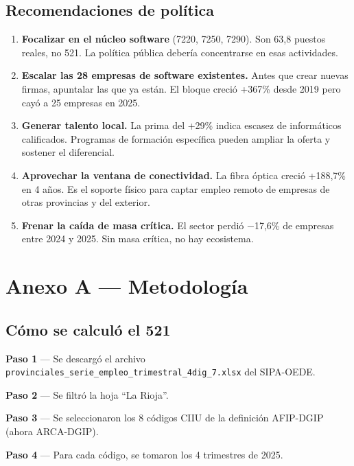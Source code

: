 \documentclass[
  spanish,
  letterpaper,
  DIV=11,
  numbers=noendperiod]{scrartcl}
\begin{document}
\subsection{Recomendaciones de
política}\label{recomendaciones-de-poluxedtica}

\begin{enumerate}
\def\labelenumi{\arabic{enumi}.}
\item
  \textbf{Focalizar en el núcleo software} (7220, 7250, 7290). Son 63,8
  puestos reales, no 521. La política pública debería concentrarse en
  esas actividades.
\item
  \textbf{Escalar las 28 empresas de software existentes.} Antes que
  crear nuevas firmas, apuntalar las que ya están. El bloque creció
  +367\% desde 2019 pero cayó a 25 empresas en 2025.
\item
  \textbf{Generar talento local.} La prima del +29\% indica escasez de
  informáticos calificados. Programas de formación específica pueden
  ampliar la oferta y sostener el diferencial.
\item
  \textbf{Aprovechar la ventana de conectividad.} La fibra óptica creció
  +188,7\% en 4 años. Es el soporte físico para captar empleo remoto de
  empresas de otras provincias y del exterior.
\item
  \textbf{Frenar la caída de masa crítica.} El sector perdió −17,6\% de
  empresas entre 2024 y 2025. Sin masa crítica, no hay ecosistema.
\end{enumerate}

\section{Anexo A --- Metodología}\label{sec-anexo}

\subsection{Cómo se calculó el 521}\label{cuxf3mo-se-calculuxf3-el-521}

\textbf{Paso 1} --- Se descargó el archivo
\texttt{provinciales\_serie\_empleo\_trimestral\_4dig\_7.xlsx} del
SIPA-OEDE.

\textbf{Paso 2} --- Se filtró la hoja ``La Rioja''.

\textbf{Paso 3} --- Se seleccionaron los 8 códigos CIIU de la definición
AFIP-DGIP (ahora ARCA-DGIP).

\textbf{Paso 4} --- Para cada código, se tomaron los 4 trimestres de
2025.
\end{document}
